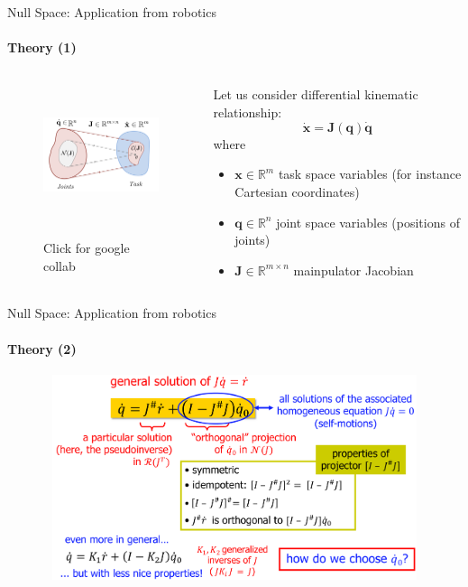 \documentclass[aspectratio=169]{beamer}
\begin{document}
\begin{frame}[t]{Null Space: Application from robotics}
\framesubtitle{Theory (1)}
\begin{columns}[T,onlytextwidth]
\begin{column}{0.46\textwidth}
\begin{figure}[H]
    \href{https://colab.research.google.com/drive/1VJGLiDYiWY2EeecCETGjEkZpjaqL8v5e?usp=sharing}{\centering\includegraphics[height=4cm,width=1\textwidth,keepaspectratio]{jacobian_mapping.PNG}}
    \caption{Click for google collab}
    \label{fig:jacobian_mapping.PNG}
\end{figure}
\end{column}
\begin{column}{0.54\textwidth}
    Let us consider differential kinematic relationship:
    \begin{equation}
        \dot{\boldsymbol{x}} = \mathbf{J}(\mathbf{q})\dot{\mathbf{q}}
    \end{equation}
    where
    \begin{itemize}
        \item   $\boldsymbol{x} \in \mathbb{R}^m$ task space variables (for instance Cartesian coordinates)
        \item   $\mathbf{q} \in \mathbb{R}^n$ joint space variables (positions of joints)
        \item   $\mathbf{J} \in \mathbb{R}^{m\times n}$ mainpulator Jacobian
    \end{itemize}
\end{column}
\end{columns}
\end{frame}

\begin{frame}[t]{Null Space: Application from robotics}
    \framesubtitle{Theory (2)}
    \vspace{-0.6cm}
    \begin{figure}[H]
        \centering\includegraphics[height=6cm,width=1\textwidth,keepaspectratio]{rob_app_general_idea.png}
        \label{fig:rob_app_general_idea.png}
    \end{figure}
\end{frame}
\end{document}
